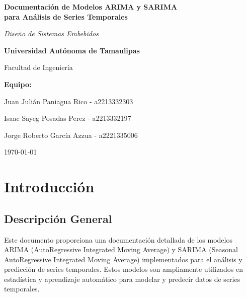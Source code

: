 \documentclass[12pt,letterpaper]{report}
\begin{document}
\begin{titlepage}
    \centering
    \vspace*{1cm}
    {\Huge\bfseries Documentación de Modelos ARIMA y SARIMA\\para Análisis de Series Temporales\par}
    \vspace{2cm}
    {\Large\itshape Diseño de Sistemas Embebidos\par}
    \vspace{3cm}


    \vspace{3cm}

    {\Large\bfseries Universidad Autónoma de Tamaulipas\par}
    \vspace{0.5cm}
    {\large Facultad de Ingeniería\par}
    \vspace{1.5cm}

    {\large\bfseries Equipo:\par}
    \vspace{0.5cm}
    {\large Juan Julián Paniagua Rico - a2213332303\par}
    {\large Isaac Sayeg Posadas Perez - a2213332197\par}
    {\large Jorge Roberto García Azzua - a2221335006\par}
    \vspace{1.5cm}

    {\large \today\par}
\end{titlepage}


\thispagestyle{fancy}

\newpage

\chapter{Introducción}

\section{Descripción General}
Este documento proporciona una documentación detallada de los modelos ARIMA (AutoRegressive Integrated Moving Average) y SARIMA (Seasonal AutoRegressive Integrated Moving Average) implementados para el análisis y predicción de series temporales. Estos modelos son ampliamente utilizados en estadística y aprendizaje automático para modelar y predecir datos de series temporales.
\end{document}
